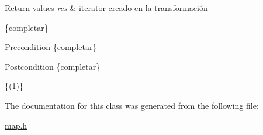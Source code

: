 \begin{DoxyRetVals}{Return values}
{\em res} & iterator creado en la transformación\\
\hline
\end{DoxyRetVals}
\{completar\}

\begin{DoxyPrecond}{Precondition}
\{completar\} 
\end{DoxyPrecond}
\begin{DoxyPostcond}{Postcondition}
\{completar\}
\end{DoxyPostcond}
\{(1)\} 

The documentation for this class was generated from the following file\+:\begin{DoxyCompactItemize}
\item 
\hyperlink{map_8h}{map.\+h}\end{DoxyCompactItemize}

